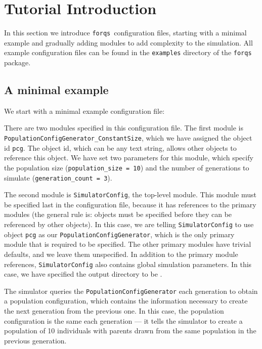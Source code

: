 \documentclass{article}
\newcommand{\forqs}[0]{\texttt{forqs }}
\newcommand{\codeinput}[1]{\begin{small}  \end{small}}
\begin{document}
\clearpage

\section{Tutorial Introduction}

\setcounter{subsection}{-1} %

In this section we introduce \forqs configuration files, starting with a
minimal example and gradually adding modules to add complexity to the
simulation.  All example configuration files can be found in the \texttt{examples}
directory of the \forqs package.

\subsection{A minimal example}

We start with a minimal example configuration file:
\codeinput{../examples/tutorial_0_minimal.txt}

There are two modules specified in this configuration file.  The first module
is \texttt{PopulationConfigGenerator\_ConstantSize}, which we have assigned the
object id \texttt{pcg}.  The object id, which can be any text string, allows
other objects to reference this object.  We have set two parameters for this
module, which specify the population size (\texttt{population\_size = 10}) and 
the number of generations to simulate (\texttt{generation\_count = 3}).

The second module is \texttt{SimulatorConfig}, the top-level module.   This
module must be specified last in the configuration file, because it has
references to the primary modules (the general rule is: objects must be
specified before they can be referenced by other objects).  In this case, we
are telling \texttt{SimulatorConfig} to use object \texttt{pcg} as our
\texttt{PopulationConfigGenerator}, which is the only primary module that is
required to be specified.  The other primary modules have trivial
defaults, and we leave them unspecified.  In addition to the primary module
references, \texttt{SimulatorConfig} also contains global simulation
parameters.  In this case, we have specified the output directory to be
.

The simulator queries the \texttt{PopulationConfigGenerator} each generation to
obtain a population configuration, which contains the information necessary to
create the next generation from the previous one.  In this case, the population
configuration is the same each generation --- it tells the simulator to create a
population of 10 individuals with parents drawn from the same population in
the previous generation.
\end{document}
